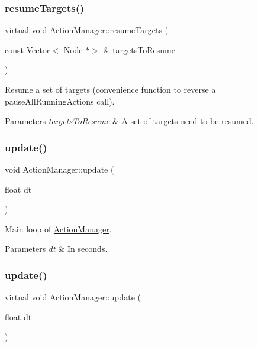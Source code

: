 \subsubsection{\texorpdfstring{resume\+Targets()}{resumeTargets()}\hspace{0.1cm}{\footnotesize\ttfamily [2/2]}}
{\footnotesize\ttfamily virtual void Action\+Manager\+::resume\+Targets (\begin{DoxyParamCaption}\item[{const \hyperlink{classVector}{Vector}$<$ \hyperlink{classNode}{Node} $\ast$$>$ \&}]{targets\+To\+Resume }\end{DoxyParamCaption})\hspace{0.3cm}{\ttfamily [virtual]}}

Resume a set of targets (convenience function to reverse a pause\+All\+Running\+Actions call).


\begin{DoxyParams}{Parameters}
{\em targets\+To\+Resume} & A set of targets need to be resumed. \\
\hline
\end{DoxyParams}
\mbox{\label{classActionManager_ab4f35fe52781cc9d972c89f8ab2381a9}} 
\subsubsection{\texorpdfstring{update()}{update()}\hspace{0.1cm}{\footnotesize\ttfamily [1/2]}}
{\footnotesize\ttfamily void Action\+Manager\+::update (\begin{DoxyParamCaption}\item[{float}]{dt }\end{DoxyParamCaption})}

Main loop of \hyperlink{classActionManager}{Action\+Manager}. 
\begin{DoxyParams}{Parameters}
{\em dt} & In seconds. \\
\hline
\end{DoxyParams}
\mbox{\label{classActionManager_ab66795eadfb5765d7a93587ebd2eb00c}} 
\subsubsection{\texorpdfstring{update()}{update()}\hspace{0.1cm}{\footnotesize\ttfamily [2/2]}}
{\footnotesize\ttfamily virtual void Action\+Manager\+::update (\begin{DoxyParamCaption}\item[{float}]{dt }\end{DoxyParamCaption})\hspace{0.3cm}{\ttfamily [virtual]}}

